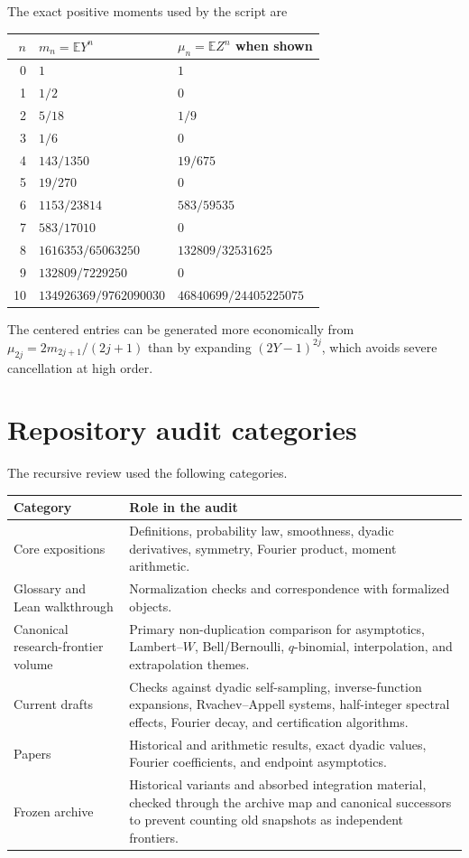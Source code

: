 \documentclass[11pt,oneside]{article}
\theoremstyle{definition}
\newcommand{\E}{\mathbb E}
\begin{document}
The exact positive moments used by the script are
\begin{longtable}{@{}rll@{}}
\toprule
\(n\)&\(m_n=\E Y^n\)&\(\mu_n=\E Z^n\) when shown\\
\midrule
0&\(1\)&\(1\)\\
1&\(1/2\)&\(0\)\\
2&\(5/18\)&\(1/9\)\\
3&\(1/6\)&\(0\)\\
4&\(143/1350\)&\(19/675\)\\
5&\(19/270\)&\(0\)\\
6&\(1153/23814\)&\(583/59535\)\\
7&\(583/17010\)&\(0\)\\
8&\(1616353/65063250\)&\(132809/32531625\)\\
9&\(132809/7229250\)&\(0\)\\
10&\(134926369/9762090030\)&\(46840699/24405225075\)\\
\bottomrule
\end{longtable}
The centered entries can be generated more economically from
\(\mu_{2j}=2m_{2j+1}/(2j+1)\) than by expanding \((2Y-1)^{2j}\), which avoids severe
cancellation at high order.

\section{Repository audit categories}

The recursive review used the following categories.
\begin{longtable}{@{}p{}p{}@{}}
\toprule
Category&Role in the audit\\
\midrule
Core expositions&Definitions, probability law, smoothness, dyadic derivatives, symmetry,
Fourier product, moment arithmetic.\\
Glossary and Lean walkthrough&Normalization checks and correspondence with formalized
objects.\\
Canonical research-frontier volume&Primary non-duplication comparison for asymptotics,
Lambert--\(W\), Bell/Bernoulli, \(q\)-binomial, interpolation, and extrapolation themes.\\
Current drafts&Checks against dyadic self-sampling, inverse-function expansions,
Rvachev--Appell systems, half-integer spectral effects, Fourier decay, and certification
algorithms.\\
Papers&Historical and arithmetic results, exact dyadic values, Fourier coefficients, and
endpoint asymptotics.\\
Frozen archive&Historical variants and absorbed integration material, checked through the
archive map and canonical successors to prevent counting old snapshots as independent
frontiers.\\
\bottomrule
\end{longtable}
\end{document}

